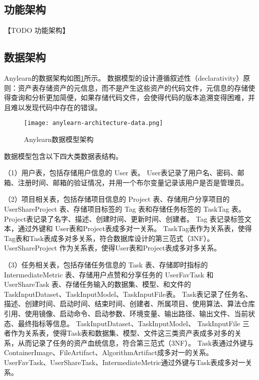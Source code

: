 \subsection{功能架构}

【TODO 功能架构】

\subsection{数据架构}

Anylearn的数据架构如图\ref{fig:anylearndata}所示。
数据模型的设计遵循叙述性（declarativity）原则\cite{Sch17}：资产表存储资产的元信息，而不是产生这些资产的代码文件，元信息的存储使得查询和分析更加简便，如果存储代码文件，会使得代码的版本追溯变得困难，并且难以发现代码中存在的错误。

\begin{figure}
  \centering
  \texttt{[image: anylearn-architecture-data.png]}
  \caption{Anylearn数据模型架构}
  \label{fig:anylearndata}
\end{figure}

数据模型包含以下四大类数据表结构。

（1）用户表，包括存储用户信息的 User 表。
User表记录了用户名、密码、邮箱、注册时间、邮箱的验证情况，并用一个布尔变量记录该用户是否是管理员。

（2）项目相关表，包括存储项目信息的 Project 表、存储用户分享项目的 UserShareProject 表、存储项目标签的 Tag 表和存储任务标签的 TaskTag 表。
Project表记录了名字、描述、创建时间、更新时间、创建者。
Tag 表记录标签文本，通过外键和 User表和Project表成多对一关系。
TaskTag表作为关系表，使得Tag表和Task表成多对多关系，符合数据库设计的第三范式（3NF）。
UserShareProject 作为关系表，使得User表和Project表成多对多关系。

（3）任务相关表，包括存储任务信息的 Task 表、存储即时指标的 IntermediateMetric 表、存储用户点赞和分享任务的 UserFavTask 和 UserShareTask 表、存储任务输入的数据集、模型、和文件的 TaskInputDataset、TaskInputModel、TaskInputFile表。
Task表记录了任务名、描述、创建时间、启动时间、结束时间、创建者、所属项目、使用算法、算法仓库引用、使用镜像、启动命令、启动参数、环境变量、输出路径、输出文件、当前状态、最终指标等信息。
TaskInputDataset、TaskInputModel、 TaskInputFile 三者作为关系表，使得Task表和数据集、模型、文件这三类资产表成多对多的关系，从而记录了任务的资产血统信息，符合第三范式（3NF）。
Task表通过外键与ContainerImage、FileArtifact、AlgorithmArtifact成多对一的关系。
UserFavTask、UserShareTask、IntermediateMetric通过外键与Task表成多对一关系。


